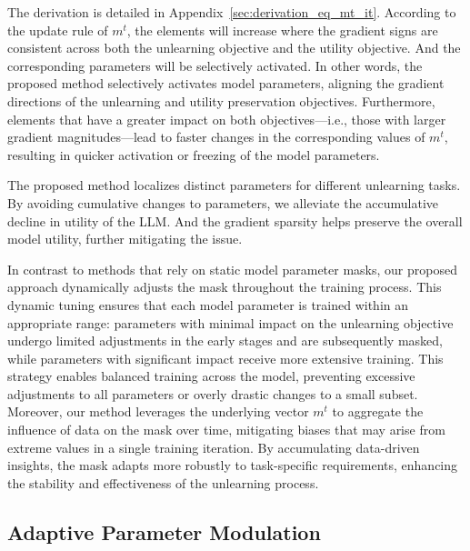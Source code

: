 \documentclass{article}
\theoremstyle{plain}
\theoremstyle{definition}
\theoremstyle{remark}
\begin{document}
The derivation is detailed in Appendix~\ref{sec:derivation_eq_mt_it}.
According to the update rule of $m^t$, the elements will increase where the gradient signs are consistent across both the unlearning objective and the utility objective.
And the corresponding parameters will be selectively activated.
In other words, the proposed method selectively activates model parameters, aligning the gradient directions of the unlearning and utility preservation objectives.
Furthermore, elements that have a greater impact on both objectives—i.e., those with larger gradient magnitudes—lead to faster changes in the corresponding values of $m^t$, resulting in quicker activation or freezing of the model parameters.

The proposed method localizes distinct parameters for different unlearning tasks.
By avoiding cumulative changes to parameters, we alleviate the accumulative decline in utility of the LLM.
And the gradient sparsity helps preserve the overall model utility, further mitigating the issue.

In contrast to methods that rely on static model parameter masks, our proposed approach dynamically adjusts the mask throughout the training process. This dynamic tuning ensures that each model parameter is trained within an appropriate range: parameters with minimal impact on the unlearning objective undergo limited adjustments in the early stages and are subsequently masked, while parameters with significant impact receive more extensive training. This strategy enables balanced training across the model, preventing excessive adjustments to all parameters or overly drastic changes to a small subset. Moreover, our method leverages the underlying vector $m^t$ to aggregate the influence of data on the mask over time, mitigating biases that may arise from extreme values in a single training iteration. By accumulating data-driven insights, the mask adapts more robustly to task-specific requirements, enhancing the stability and effectiveness of the unlearning process.

\subsection{Adaptive Parameter Modulation}
\label{sec:method_modulation}
\end{document}
